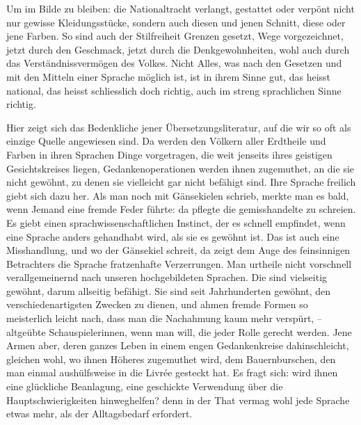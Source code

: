 Um im Bilde zu bleiben: die Nationaltracht verlangt, gestattet oder verpönt nicht nur gewisse Kleidungsstücke, sondern auch diesen und jenen Schnitt, diese oder jene Farben. So sind auch der Stilfreiheit Grenzen gesetzt, Wege vorgezeichnet, jetzt durch den Geschmack, jetzt durch die Denkgewohnheiten, wohl auch durch das Verständnissvermögen des Volkes. Nicht Alles, was nach den Gesetzen und mit den Mitteln einer Sprache möglich ist, ist in ihrem Sinne gut, das heisst national, das heisst schliesslich doch richtig, auch im streng sprachlichen Sinne richtig.

Hier zeigt sich das Bedenkliche jener Übersetzungsliteratur, auf die wir so oft als einzige Quelle angewiesen sind. Da werden den Völkern aller Erdtheile und Farben in ihren Sprachen Dinge vorgetragen, die weit jenseits ihres geistigen Gesichtskreises liegen, Gedankenoperationen werden ihnen zugemuthet, an die sie nicht gewöhnt, zu denen sie viel\label{fp.110}leicht gar nicht befähigt sind. Ihre Sprache freilich giebt sich dazu her. Als man noch mit Gänsekielen schrieb, merkte man es bald, wenn Jemand eine fremde Feder führte: da pflegte die gemisshandelte zu schreien. Es giebt einen sprachwissenschaftlichen Instinct, der es schnell empfindet, wenn eine Sprache anders gehandhabt wird, als sie es gewöhnt ist. Das ist auch eine Misshandlung, und wo der Gänsekiel schreit, da zeigt dem Auge des feinsinnigen Betrachters die Sprache fratzenhafte Verzerrungen. Man urtheile nicht vorschnell verallgemeinernd nach unseren hochgebildeten Sprachen. Die sind vielseitig gewöhnt, darum allseitig befähigt. Sie sind seit Jahrhunderten gewöhnt, den verschiedenartigsten Zwecken zu dienen, und ahmen fremde Formen so meisterlich leicht nach, dass man die Nachahmung kaum mehr verspürt, – altgeübte Schauspielerinnen, wenn man will, die jeder Rolle gerecht werden. Jene Armen aber, deren ganzes Leben in einem engen Gedankenkreise dahinschleicht, gleichen wohl, wo ihnen Höheres zugemuthet wird, dem Bauernburschen, den man einmal aushülfsweise in die Livrée gesteckt hat. Es fragt sich: wird ihnen eine glückliche Beanlagung, eine geschickte Verwendung über die Hauptschwierigkeiten hinweghelfen? denn in der That vermag wohl jede Sprache etwas mehr, als der Alltagsbedarf erfordert.

\label{sp.106}

